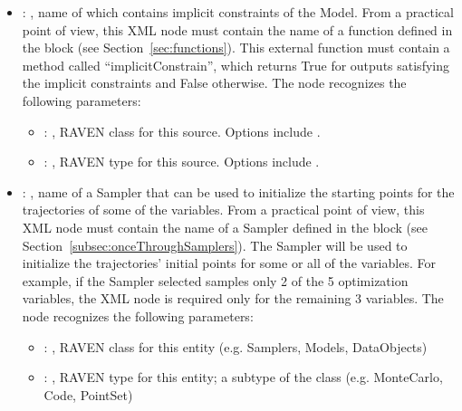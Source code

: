 \begin{itemize}
    \item {}: , 
      name of  which contains implicit constraints of the Model. From a practical
      point of view, this XML node must contain the name of a function defined in the
                     block (see Section~\ref{sec:functions}). This external
      function must contain a method called               ``implicitConstrain'', which returns True
      for outputs satisfying the implicit constraints and False otherwise.
      The  node recognizes the following parameters:
        \begin{itemize}
          \item {}: , 
            RAVEN class for this source. Options include .
          \item {}: , 
            RAVEN type for this source. Options include .
      \end{itemize}

    \item {}: , 
      name of a Sampler that can be used to initialize the starting points for the trajectories
      of some of the variables. From a practical point of view, this XML node must contain the
      name of a Sampler defined in the  block (see
      Section~\ref{subsec:onceThroughSamplers}).               The Sampler will be used to
      initialize the trajectories' initial points for some or all               of the variables.
      For example, if the Sampler selected samples only 2 of the 5 optimization
      variables, the  XML node is required only for the remaining 3 variables.
      The  node recognizes the following parameters:
        \begin{itemize}
          \item {}: , 
            RAVEN class for this entity (e.g. Samplers, Models, DataObjects)
          \item {}: , 
            RAVEN type for this entity; a subtype of the class (e.g. MonteCarlo, Code, PointSet)
      \end{itemize}


\end{itemize}
